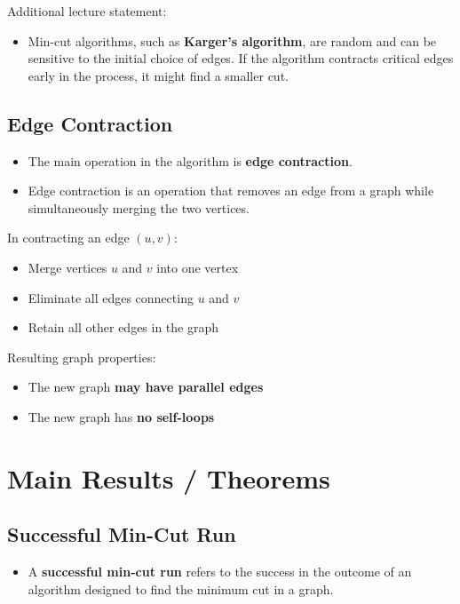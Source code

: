 \documentclass[11pt]{article}
\begin{document}
Additional lecture statement:

\begin{itemize}
    \item Min-cut algorithms, such as \textbf{Karger’s algorithm}, are random and can be sensitive to the initial choice of edges. If the algorithm contracts critical edges early in the process, it might find a smaller cut.
\end{itemize}

\subsection{Edge Contraction}

\begin{itemize}
    \item The main operation in the algorithm is \textbf{edge contraction}.
    \item Edge contraction is an operation that removes an edge from a graph while simultaneously merging the two vertices.
\end{itemize}

In contracting an edge \( (u, v) \):

\begin{itemize}
    \item Merge vertices \( u \) and \( v \) into one vertex
    \item Eliminate all edges connecting \( u \) and \( v \)
    \item Retain all other edges in the graph
\end{itemize}

Resulting graph properties:

\begin{itemize}
    \item The new graph \textbf{may have parallel edges}
    \item The new graph has \textbf{no self-loops}
\end{itemize}

\section{Main Results / Theorems}

\subsection{Successful Min-Cut Run}

\begin{itemize}
    \item A \textbf{successful min-cut run} refers to the success in the outcome of an algorithm designed to find the minimum cut in a graph.
\end{itemize}
\end{document}
